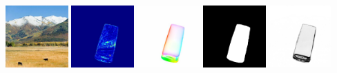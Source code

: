     \\
    \includegraphics[width=0.18\textwidth]{ch-tomnet/images/Synth/synthetic_179_shap0000_COCO_val2014_000000478055_ref.jpg}
    \includegraphics[width=0.18\textwidth]{ch-tomnet/images/Synth/synthetic_179_shap0000_COCO_val2014_000000478055_diff.jpg}
    \includegraphics[width=0.18\textwidth]{ch-tomnet/images/Synth/synthetic_179_shap0000_COCO_val2014_000000478055_fcolor.jpg}
    \includegraphics[width=0.18\textwidth]{ch-tomnet/images/Synth/synthetic_179_shap0000_COCO_val2014_000000478055_mask.png}
    \includegraphics[width=0.18\textwidth]{ch-tomnet/images/Synth/synthetic_179_shap0000_COCO_val2014_000000478055_rho.png}
    \\

